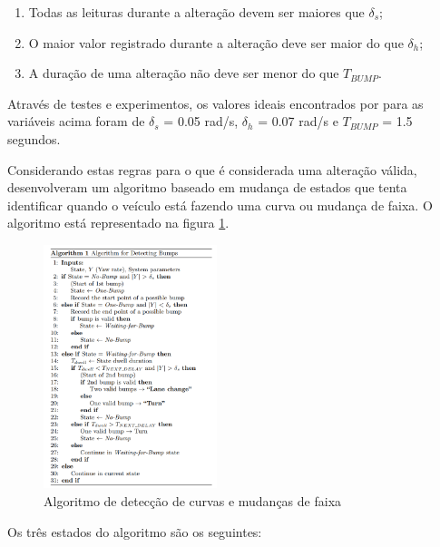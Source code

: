 \begin{enumerate}
  \item Todas as leituras durante a alteração devem ser maiores que $\delta_{s}$;
  \item O maior valor registrado durante a alteração deve ser maior do que $\delta_{h}$;
  \item A duração de uma alteração não deve ser menor do que $T_{BUMP}$.
\end{enumerate}

Através de testes e experimentos, os valores ideais encontrados por  para as variáveis acima foram de $\delta_{s}$ = 0.05 rad/s,
$\delta_{h}$ = 0.07 rad/s e $T_{BUMP}$ = 1.5 segundos.

Considerando estas regras para o que é considerada uma alteração válida,  desenvolveram um algoritmo baseado em mudança de estados
que tenta identificar quando o veículo está fazendo uma curva ou mudança de faixa. O algoritmo está representado na figura \ref{algoritmo-giroscopio}.

\begin{figure}[h]
  \centering
  \includegraphics[width=0.45\textwidth]{images/algoritmo-giroscopio.png}
  \caption{Algoritmo de detecção de curvas e mudanças de faixa \cite{chen2015invisible}}
  \label{algoritmo-giroscopio}
\end{figure}

Os três estados do algoritmo são os seguintes:


